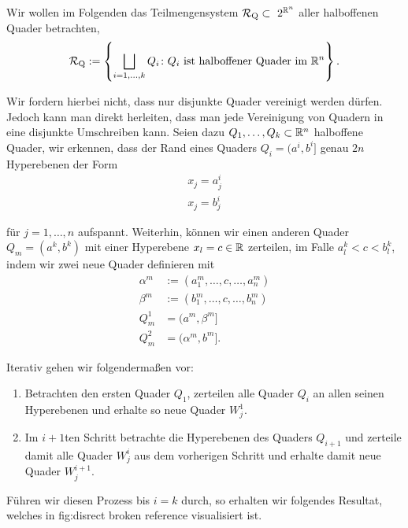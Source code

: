 \par
Wir wollen im Folgenden das Teilmengensystem \(\mathcal{R}_{\text{Q}}\subset\ 2^{\mathbb{R}^n}\) aller halboffenen Quader betrachten,
\begin{align*}
\mathcal{R}_{\text{Q}} := \left\{ \bigsqcup_{i=1,\ldots,k} Q_i \colon Q_i \text{ ist halboffener Quader im } \mathbb{R}^n \right\}.
\end{align*}
\par
Wir fordern hierbei nicht, dass nur disjunkte Quader vereinigt werden dürfen. Jedoch kann man direkt herleiten, dass man jede Vereinigung von Quadern in eine disjunkte Umschreiben kann. Seien dazu \(Q_1,\ldots,Q_k\subset\mathbb{R}^n\) halboffene Quader, wir erkennen, dass der Rand eines Quaders \(Q_i=(a^i,b^i]\) genau \(2n\) Hyperebenen der Form
\begin{align*}
x_j = a^i_j\\
x_j = b^i_j
\end{align*}
\par
für \(j=1,\ldots,n\) aufspannt. Weiterhin, können wir einen anderen Quader \(Q_m=(a^k,b^k)\) mit einer Hyperebene \(x_l=c\in\mathbb{R}\) zerteilen, im Falle \(a^k_l < c < b^k_l\), indem wir zwei neue Quader definieren mit
\begin{align*}
\alpha^m&:=(a^m_1,\ldots,c,\ldots,a^m_n)\\
\beta^m&:=(b^m_1,\ldots,c,\ldots,b^m_n)\\
Q_m^1&=(a^m,\beta^m]\\
Q_m^2&=(\alpha^m,b^m].
\end{align*}
\par
Iterativ gehen wir folgendermaßen vor:
\begin{enumerate}

\item {} 
\par
Betrachten den ersten Quader \(Q_1\), zerteilen alle Quader \(Q_i\) an allen seinen Hyperebenen und erhalte so neue Quader \(W^1_j\).

\item {} 
\par
Im \(i+1\)ten Schritt betrachte die Hyperebenen des Quaders \(Q_{i+1}\) und zerteile damit alle Quader \(W^i_j\) aus dem vorherigen Schritt und erhalte damit neue Quader \(W^{i+1}_j\).

\end{enumerate}

\par
Führen wir diesen Prozess bis \(i=k\) durch, so erhalten wir folgendes Resultat, welches in {fig:disrect broken reference} visualisiert ist.

